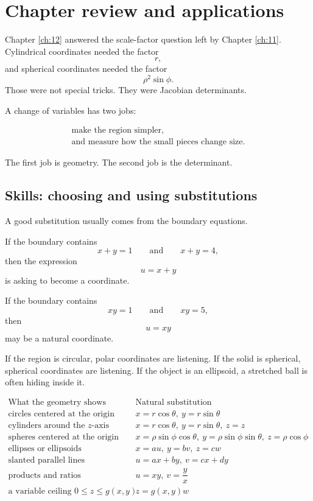 \section{Chapter review and applications}
\label{sec:12.7}

Chapter \ref{ch:12} answered the scale-factor question left by Chapter \ref{ch:11}.
Cylindrical coordinates needed the factor
\[
    r,
\]
and spherical coordinates needed the factor
\[
    \rho^2\sin\phi.
\]
Those were not special tricks.  They were Jacobian determinants.

A change of variables has two jobs:

\[
\boxed{
\begin{array}{c}
\text{make the region simpler,}\\[1mm]
\text{and measure how the small pieces change size.}
\end{array}
}
\]

The first job is geometry.  The second job is the determinant.

\subsection{Skills: choosing and using substitutions}

A good substitution usually comes from the boundary equations.

If the boundary contains
\[
    x+y=1
    \qquad\text{and}\qquad
    x+y=4,
\]
then the expression
\[
    u=x+y
\]
is asking to become a coordinate.

If the boundary contains
\[
    xy=1
    \qquad\text{and}\qquad
    xy=5,
\]
then
\[
    u=xy
\]
may be a natural coordinate.

If the region is circular, polar coordinates are listening.  If the solid is spherical,
spherical coordinates are listening.  If the object is an ellipsoid, a stretched ball is
often hiding inside it.

\[
\begin{array}{c|c}
\text{What the geometry shows} & \text{Natural substitution} \\ \hline
\text{circles centered at the origin} & x=r\cos\theta,\ y=r\sin\theta\\[1mm]
\text{cylinders around the }z\text{-axis} & x=r\cos\theta,\ y=r\sin\theta,\ z=z\\[1mm]
\text{spheres centered at the origin} &
x=\rho\sin\phi\cos\theta,\ y=\rho\sin\phi\sin\theta,\ z=\rho\cos\phi\\[1mm]
\text{ellipses or ellipsoids} & x=au,\ y=bv,\ z=cw\\[1mm]
\text{slanted parallel lines} & u=ax+by,\ v=cx+dy\\[1mm]
\text{products and ratios} & u=xy,\ v=\dfrac{y}{x}\\[3mm]
\text{a variable ceiling }0\le z\le g(x,y) & z=g(x,y)w
\end{array}
\]

